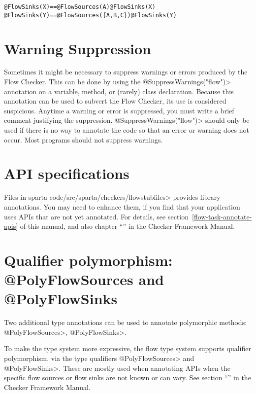 \begin{alltt}
  @FlowSinks(X)                   ==   @FlowSources(A) @FlowSinks(X)
  @FlowSinks(Y)                   ==   @FlowSources(\{A,B,C\}) @FlowSinks(Y)
\end{alltt}


\section{Warning Suppression\label{sec:waringsuppression}}
 
Sometimes it might be necessary to suppress warnings or errors produced by
the Flow Checker.  This can be done by using the
\<@SuppressWarnings("flow")> annotation on a variable, method, or (rarely)
class declaration.  Because this annotation can be used to subvert the Flow
Checker, its use is considered suspicious.  Anytime a warning or error is
suppressed, you must write a brief comment justifying the suppression.
\<@SuppressWarnings("flow")> should only be used if there is no way to
annotate the code so that an error or warning does not occur.  Most
programs should not suppress warnings.


\section{API specifications\label{sec:apispecs}}

Files in  \<sparta-code/src/sparta/checkers/flowstubfiles> provides library
annotations.  You may need to enhance them, if you find that your application
uses APIs that are not yet annotated.  For details, see
section~\ref{flow-task-annotate-apis} of this manual, and also 
chapter
``'' in the Checker Framework Manual.


\section{Qualifier polymorphism: @PolyFlowSources  and @PolyFlowSinks \label{sec:polyflowsources}}

Two additional type annotations can be used to annotate polymorphic
methods: \<@PolyFlowSources>, \<@PolyFlowSinks>.

To make the type system more expressive, the flow type system supports
qualifier polymorphism, via the type qualifiers \<@PolyFlowSources> and
\<@PolyFlowSinks>.  These are mostly used when annotating APIs when the
specific flow sources or flow sinks are not known or can vary. 
See section ``'' in the Checker Framework Manual.  

